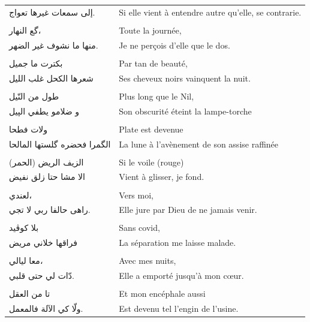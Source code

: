 \begin{longtable}{R{0.3\textwidth} L{0.65\textwidth}}
\textarabic{إلى سمعات غيرها تعواج.}      &       Si elle vient à entendre autre qu’elle, se contrarie.   \\
\\
\textarabic{گع النهار،}                  &       Toute la journée,   \\
\textarabic{منها ما نشوف غير الضهر.}     &       Je ne perçois d’elle que le dos.   \\
\\
\textarabic{بكترت ما جميل}               &       Par tan de beauté,   \\
\textarabic{شعرها الكحل غلب الليل}       &       Ses cheveux noirs vainquent la nuit.   \\
\\
\textarabic{طول من النّيل}                &       Plus long que le Nil,   \\
\textarabic{و ضلامو يطفي الپيل}          &       Son obscurité éteint la lampe-torche   \\
\\
\textarabic{ولات فطحا}                    &       Plate est devenue   \\
\textarabic{الگمرا فحضره گلستها المالحا} &       La lune à l’avènement de son assise raffinée   \\
\\
\textarabic{الزيف الريض (الحمر)}         &       Si le voile  (rouge)   \\
\textarabic{الا مشا حتا زلق نفيض}         &       Vient à glisser, je fond.   \\
\\
\textarabic{لعندي،}                      &       Vers moi,   \\
\textarabic{راهى حالفا ربي لا تجي.}       &       Elle jure par Dieu de ne jamais venir.   \\
\\
\textarabic{بلا كوڤيد}                    &       Sans covid,   \\
\textarabic{فراقها خلاني مريض}            &       La séparation me laisse malade. \\
\\
\textarabic{معا ليالي،}                  &       Avec mes nuits,   \\
\textarabic{دّات لي حتى قلبي.}            &       Elle a emporté jusqu’à mon cœur.   \\
\\
\textarabic{تا من العقل}                 &       Et mon encéphale aussi   \\
\textarabic{ولّا كي الآلة فالمعمل.}        &       Est devenu tel l’engin de l’usine.   \\

\end{longtable}
